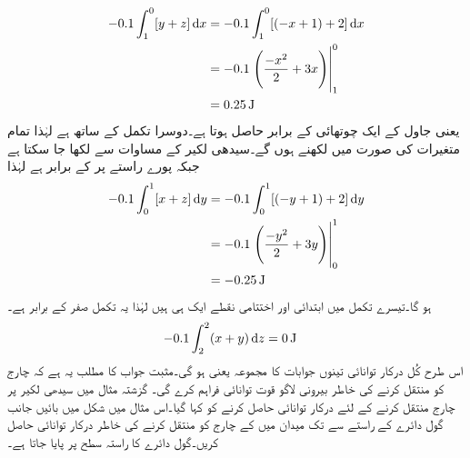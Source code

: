 \begin{align*}
-0.1 \int_{1}^{0} [y+z]\dif x &=-0.1 \int_{1}^{0} [(-x+1)+2] \dif x\\
&=-0.1\left.\left(\frac{-x^2}{2}+3x\right) \right|_{1}^{0}\\
&=\SI{0.25}{\joule}
\end{align*}
یعنی جاول کے ایک چوتھائی کے برابر حاصل ہوتا ہے۔دوسرا تکمل  کے ساتھ ہے لہٰذا تمام متغیرات   کی صورت میں لکھنے ہوں گے۔سیدھی لکیر کے مساوات سے   لکھا جا سکتا ہے جبکہ  پورے راستے پر   کے برابر ہے لہٰذا
\begin{align*}
-0.1 \int_{0}^{1} [x+z]\dif y &=-0.1 \int_{0}^{1} [(-y+1)+2] \dif y\\
&=-0.1 \left.\left(\frac{-y^2}{2}+3y\right) \right|_{0}^{1}\\
&=\SI{-0.25}{\joule}
\end{align*}
ہو گا۔تیسرے تکمل میں ابتدائی اور اختتامی نقطے ایک ہی ہیں لہٰذا یہ تکمل صفر کے برابر ہے۔ 
\begin{align*}
-0.1 \int_{2}^{2} (x+y) \dif z &=\SI{0}{\joule}
\end{align*}
اس طرح کُل درکار توانائی تینوں جوابات کا مجموعہ یعنی   ہو گی۔مثبت جواب کا مطلب یہ ہے کہ چارج کو منتقل کرنے کی خاطر بیرونی لاگو قوت توانائی فراہم کرے گی۔ 
گزشتہ مثال میں سیدھی لکیر پر چارج منتقل کرنے کے لئے درکار توانائی حاصل کرنے کو کہا گیا۔اس مثال میں شکل  میں بائیں جانب گول دائرے کے راستے  سے  تک  میدان میں  کے چارج کو منتقل کرنے کی خاطر درکار توانائی حاصل کریں۔گول دائرے کا راستہ  سطح پر پایا جاتا ہے۔


